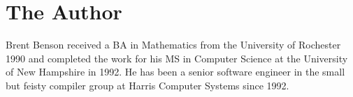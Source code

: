 \section*{The Author}

Brent Benson received a BA in Mathematics from the University of
Rochester 1990 and completed the work for his MS in Computer Science
at the University of New Hampshire in 1992.  He has been a senior
software engineer in the small but feisty compiler group at Harris
Computer Systems since 1992.


